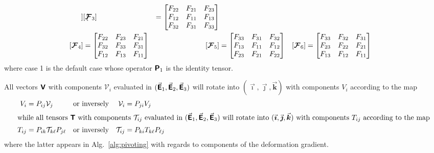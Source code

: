 \begin{subequations}
\begin{align}
\begin{bmatrix}
    \end{bmatrix} &
    [ \boldsymbol{\mathcal{F}}_3 ] & = \begin{bmatrix}
    F_{22} & F_{21} & F_{23}\\
    F_{12} & F_{11} & F_{13}\\
    F_{32} & F_{31} & F_{33}
    \end{bmatrix} \notag \\
    [ \boldsymbol{\mathcal{F}}_4 ] & = \begin{bmatrix}
    F_{22} & F_{23} & F_{21}\\
    F_{32} & F_{33} & F_{31}\\
    F_{12} & F_{13} & F_{11}
    \end{bmatrix} &
    [ \boldsymbol{\mathcal{F}}_5 ] & = \begin{bmatrix}
    F_{33} & F_{31} & F_{32}\\
    F_{13} & F_{11} & F_{12}\\
    F_{23} & F_{21} & F_{22}
    \end{bmatrix} & 
    [ \boldsymbol{\mathcal{F}}_6 ] & = \begin{bmatrix}
    F_{33} & F_{32} & F_{31}\\
    F_{23} & F_{22} & F_{21}\\
    F_{13} & F_{12} & F_{11}
    \end{bmatrix}
    \end{align}
    \normalsize
\end{subequations}
where case 1 is the default case whose operator $\boldsymbol{\mathsf{P}}_1$ is the identity tensor.

All vectors $\boldsymbol{\mathsf{V}}$ with components $\mathcal{V}_i$ evaluated in $( \vec{\boldsymbol{\mathsf{E}}}_1 , \vec{\boldsymbol{\mathsf{E}}}_2 , \vec{\boldsymbol{\mathsf{E}}}_3 )$ will rotate into $( \vec{\boldsymbol{\imath}} , \vec{\boldsymbol{\jmath}} , \vec{\boldsymbol{k}} )$ with components $V_i$ according to the map
\begin{subequations}
    \begin{align}
    V_i & = P_{ij} \mathcal{V}_j & \text{or inversely} & &
    \mathcal{V}_i & = P_{ji} V_j \\
    \intertext{while all tensors $\boldsymbol{\mathsf{T}}$ with components $\mathcal{T}_{ij}$ evaluated in $( \vec{\boldsymbol{\mathsf{E}}}_1 , \vec{\boldsymbol{\mathsf{E}}}_2 , \vec{\boldsymbol{\mathsf{E}}}_3 )$ will rotate into $( \vec{\boldsymbol{\imath}} , \vec{\boldsymbol{\jmath}} , \vec{\boldsymbol{k}} )$ with components $T_{ij}$ according to the map}
    T_{ij} & = P_{ik} \mathcal{T}_{k\ell} P_{j\ell} & \text{or inversely} & &
    \mathcal{T}_{ij} & = P_{ki} T_{k\ell} P_{\ell j}
    \end{align}
\end{subequations}
where the latter appears in Alg.~\ref{alg:pivoting} with regards to components of the deformation gradient.

